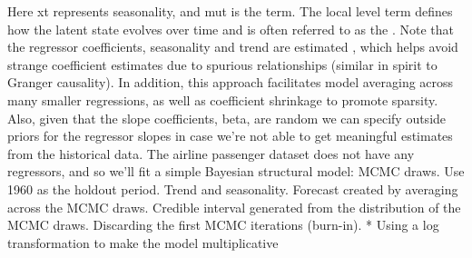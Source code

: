 {}Here \markdownRendererDollarSign{}xt\markdownRendererDollarSign{} represents seasonality, and \markdownRendererDollarSign{}\markdownRendererBackslash{}mu\markdownRendererUnderscore{}t\markdownRendererDollarSign{} is the  term. The local level term defines how the latent state evolves over time and is often referred to as the . Note that the regressor coefficients, seasonality and trend are estimated , which helps avoid strange coefficient estimates due to spurious relationships (similar in spirit to Granger causality). In addition, this approach facilitates model averaging across many smaller regressions, as well as coefficient shrinkage to promote sparsity. Also, given that the slope coefficients, \markdownRendererDollarSign{}\markdownRendererBackslash{}beta\markdownRendererDollarSign{}, are random we can specify outside priors for the regressor slopes in case we're not able to get meaningful estimates from the historical data.\markdownRendererInterblockSeparator
{}The airline passenger dataset does not have any regressors, and so we'll fit a simple Bayesian structural model:\markdownRendererInterblockSeparator
{}\markdownRendererUlBegin
{} MCMC draws.\markdownRendererUlItemEnd 
\markdownRendererUlItem Use 1960 as the holdout period.\markdownRendererUlItemEnd 
\markdownRendererUlItem Trend and seasonality.\markdownRendererUlItemEnd 
\markdownRendererUlItem Forecast created by averaging across the MCMC draws. \markdownRendererUlItemEnd 
\markdownRendererUlItem Credible interval generated from the distribution of the MCMC draws.\markdownRendererUlItemEnd 
\markdownRendererUlItem Discarding the first MCMC iterations (burn-in).\markdownRendererUlItemEnd 
\markdownRendererUlEnd \markdownRendererInterblockSeparator
{}* Using a log transformation to make the model multiplicative\relax